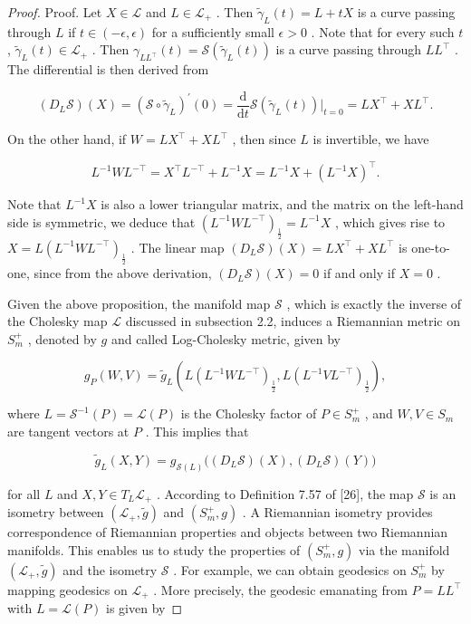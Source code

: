 \documentclass[11pt]{article}
\begin{document}
\begin{proof}
Proof. Let  $X \in \mathcal{L}$  and  $L \in \mathcal{L}_{+}$ . Then  $\tilde{\gamma}_L(t) = L + tX$  is a curve passing through  $L$  if  $t \in (-\epsilon, \epsilon)$  for a sufficiently small  $\epsilon > 0$ . Note that for every such  $t$ ,  $\tilde{\gamma}_L(t) \in \mathcal{L}_{+}$ . Then  $\gamma_{LL^{\top}}(t) = \mathcal{S}(\tilde{\gamma}_L(t))$  is a curve passing through  $LL^{\top}$ . The differential is then derived from

$$
\left(D _ {L} \mathcal {S}\right) (X) = \left(\mathcal {S} \circ \tilde {\gamma} _ {L}\right) ^ {\prime} (0) = \frac {\mathrm {d}}{\mathrm {d} t} \mathcal {S} \left(\tilde {\gamma} _ {L} (t)\right) | _ {t = 0} = L X ^ {\top} + X L ^ {\top}.
$$

On the other hand, if  $W = LX^{\top} + XL^{\top}$ , then since  $L$  is invertible, we have

$$
L ^ {- 1} W L ^ {- \top} = X ^ {\top} L ^ {- \top} + L ^ {- 1} X = L ^ {- 1} X + (L ^ {- 1} X) ^ {\top}.
$$

Note that  $L^{-1}X$  is also a lower triangular matrix, and the matrix on the left-hand side is symmetric, we deduce that  $(L^{-1}WL^{-\top})_{\frac{1}{2}} = L^{-1}X$ , which gives rise to  $X = L(L^{-1}WL^{-\top})_{\frac{1}{2}}$ . The linear map  $(D_L\mathcal{S})(X) = LX^\top +XL^\top$  is one-to-one, since from the above derivation,  $(D_L\mathcal{S})(X) = 0$  if and only if  $X = 0$ .

Given the above proposition, the manifold map  $\mathcal{S}$ , which is exactly the inverse of the Cholesky map  $\mathcal{L}$  discussed in subsection 2.2, induces a Riemannian metric on  $S_{m}^{+}$ , denoted by  $g$  and called Log-Cholesky metric, given by

$$
g _ {P} (W, V) = \tilde {g} _ {L} \left(L \left(L ^ {- 1} W L ^ {- \top}\right) _ {\frac {1}{2}}, L \left(L ^ {- 1} V L ^ {- \top}\right) _ {\frac {1}{2}}\right), \tag {3.1}
$$

where  $L = \mathcal{S}^{-1}(P) = \mathcal{L}(P)$  is the Cholesky factor of  $P \in S_m^+$ , and  $W, V \in S_m$  are tangent vectors at  $P$ . This implies that

$$
\tilde {g} _ {L} (X, Y) = g _ {\mathcal {S} (L)} \big ((D _ {L} \mathcal {S}) (X), (D _ {L} \mathcal {S}) (Y) \big)
$$

for all  $L$  and  $X,Y\in T_L\mathcal{L}_+$ . According to Definition 7.57 of [26], the map  $\mathcal{S}$  is an isometry between  $(\mathcal{L}_{+},\tilde{g})$  and  $(S_m^+,g)$ . A Riemannian isometry provides correspondence of Riemannian properties and objects between two Riemannian manifolds. This enables us to study the properties of  $(S_m^+,g)$  via the manifold  $(\mathcal{L}_{+},\tilde{g})$  and the isometry  $\mathcal{S}$ . For example, we can obtain geodesics on  $S_{m}^{+}$  by mapping geodesics on  $\mathcal{L}_{+}$ . More precisely, the geodesic emanating from  $P = LL^{\top}$  with  $L = \mathcal{L}(P)$  is given by


\end{proof}
\end{document}
